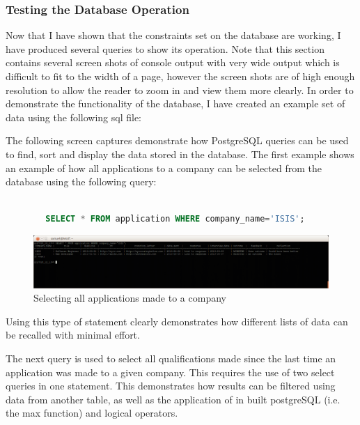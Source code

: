 \documentclass{article}
\begin{document}
\subsubsection{Testing the Database Operation}
Now that I have shown that the constraints set on the database are working, I have produced several queries to show its operation. Note that this section contains several screen shots of console output with very wide output which is difficult to fit to the width of a page, however the screen shots are of high enough resolution to allow the reader to zoom in and view them more clearly. In order to demonstrate the functionality of the database, I have created an example set of data using the following sql file:



The following screen captures demonstrate how PostgreSQL queries can be used to find, sort and display the data stored in the database. The first example shows an example of how all applications to a company can be selected from the database using the following query:

\begin{center}
	\begin{lstlisting}[language=sql, showstringspaces=false]

		SELECT * FROM application WHERE company_name='ISIS';

	\end{lstlisting}
\end{center}

\begin{figure}[H]
\centering
\includegraphics[width=1\textwidth]{img/test/test-qapp.png}
\caption{Selecting all applications made to a company}
\label{fig:test-qapp}
\end{figure}

Using this type of statement clearly demonstrates how different lists of data can be recalled with minimal effort.

The next query is used to select all qualifications made since the last time an application was made to a given company. This requires the use of two select queries in one statement. This demonstrates how results can be filtered using data from another table, as well as the application of in built postgreSQL (i.e. the max function) and logical operators.
\end{document}
